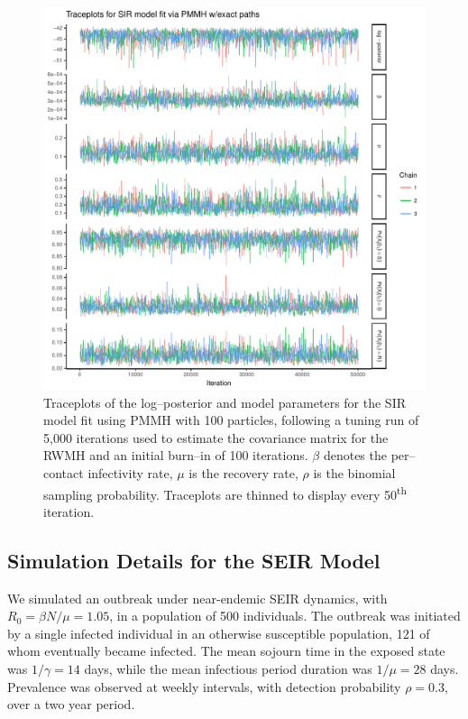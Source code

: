 \begin{figure}[htbp]
	\centering
	\includegraphics[width=0.9\linewidth]{figures/sir_pomp_exact_traceplots}
	\caption[Simulation 1 MCMC traceplots for an SIR model fit using PMMH with exact particle paths.]{Traceplots of the log--posterior and model parameters for the SIR model fit using PMMH with 100 particles, following a tuning run of 5,000 iterations used to estimate the covariance matrix for the RWMH and an initial burn--in of 100 iterations. $ \beta $ denotes the per--contact infectivity rate, $ \mu $ is the recovery rate, $ \rho $ is the binomial sampling probability. Traceplots are thinned to display every 50\textsuperscript{th} iteration.}
	\label{fig:sirpompexacttraceplots}
\end{figure}

\newpage
\subsection{Simulation Details for the SEIR Model}
\label{subsec:bda_seir_sim1_details}
We simulated an outbreak under near-endemic SEIR dynamics, with $ R_0 = \beta N / \mu = 1.05 $, in a population of 500 individuals. The outbreak was initiated by a single infected individual in an otherwise susceptible population, 121 of whom eventually became infected. The mean sojourn time in the exposed state was $ 1/\gamma = 14 $ days, while the mean infectious period duration was $ 1/\mu = 28$ days. Prevalence was observed at weekly intervals, with detection probability $ \rho = 0.3 $, over a two year period.

